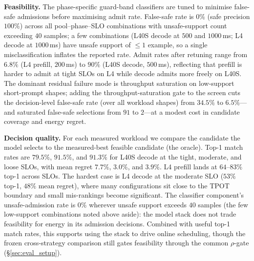 \textbf{Feasibility.} The phase-specific guard-band classifiers are tuned to minimise false-safe admissions before maximising admit rate. False-safe rate is $0\%$ (safe precision $100\%$) across all pool--phase--SLO combinations with unsafe-support count exceeding $40$ samples; a few combinations (L40S decode at $500$ and $1000$\,ms; L4 decode at $1000$\,ms) have unsafe support of $\leq 1$ example, so a single misclassification inflates the reported rate. Admit rates after retuning range from $6.8\%$ (L4 prefill, $200$\,ms) to $90\%$ (L40S decode, $500$\,ms), reflecting that prefill is harder to admit at tight SLOs on L4 while decode admits more freely on L40S.
The dominant residual failure mode is throughput saturation on low-support short-prompt shapes; adding the throughput-saturation gate to the screen cuts the decision-level false-safe rate (over all workload shapes) from $34.5\%$ to $6.5\%$---and saturated false-safe selections from $91$ to $2$---at a modest cost in candidate coverage and energy regret.

\textbf{Decision quality.} For each measured workload we compare the candidate the model selects to the measured-best feasible candidate (the oracle). Top-1 match rates are $79.5\%$, $91.5\%$, and $91.3\%$ for L40S decode at the tight, moderate, and loose SLOs, with mean regret $7.7\%$, $3.0\%$, and $3.9\%$. L4 prefill lands at $64$--$83\%$ top-1 across SLOs. The hardest case is L4 decode at the moderate SLO ($53\%$ top-1, $48\%$ mean regret), where many configurations sit close to the TPOT boundary and small mis-rankings become significant. The classifier component's unsafe-admission rate is $0\%$ wherever unsafe support exceeds $40$ samples (the few low-support combinations noted above aside): the model stack does not trade feasibility for energy in its admission decisions. Combined with useful top-1 match rates, this supports using the stack to drive online scheduling, though the frozen cross-strategy comparison still gates feasibility through the common $\rho$-gate (\S\ref{sec:eval_setup}).

